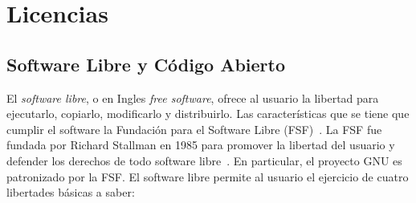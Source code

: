 \chapter{Licencias}

\section{Software Libre y Código Abierto}

El \textit{software libre}, o en Ingles \textit{free software}, ofrece
al usuario la libertad para ejecutarlo, copiarlo, modificarlo y
distribuirlo. Las características que se tiene que cumplir el software
la Fundación para el Software Libre (FSF)~\cite{Etiqueta07}. La FSF
fue fundada por Richard Stallman en 1985 para promover la libertad del
usuario y defender los derechos de todo software
libre~\cite{Etiqueta14}. En particular, el proyecto GNU es patronizado
por la FSF. El software libre permite al usuario el ejercicio de
cuatro libertades básicas a saber:

